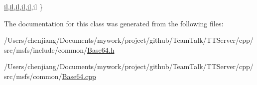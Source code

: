 \begin{DoxyCode}
  \hyperlink{namespacemsfs_a381cc34886844e8885b4a6ed94dcf51a}{il},\hyperlink{namespacemsfs_a381cc34886844e8885b4a6ed94dcf51a}{il},\hyperlink{namespacemsfs_a381cc34886844e8885b4a6ed94dcf51a}{il},\hyperlink{namespacemsfs_a381cc34886844e8885b4a6ed94dcf51a}{il},\hyperlink{namespacemsfs_a381cc34886844e8885b4a6ed94dcf51a}{il},il               
\}
\end{DoxyCode}


The documentation for this class was generated from the following files\+:\begin{DoxyCompactItemize}
\item 
/\+Users/chenjiang/\+Documents/mywork/project/github/\+Team\+Talk/\+T\+T\+Server/cpp/src/msfs/include/common/\hyperlink{_base64_8h}{Base64.\+h}\item 
/\+Users/chenjiang/\+Documents/mywork/project/github/\+Team\+Talk/\+T\+T\+Server/cpp/src/msfs/common/\hyperlink{_base64_8cpp}{Base64.\+cpp}\end{DoxyCompactItemize}
